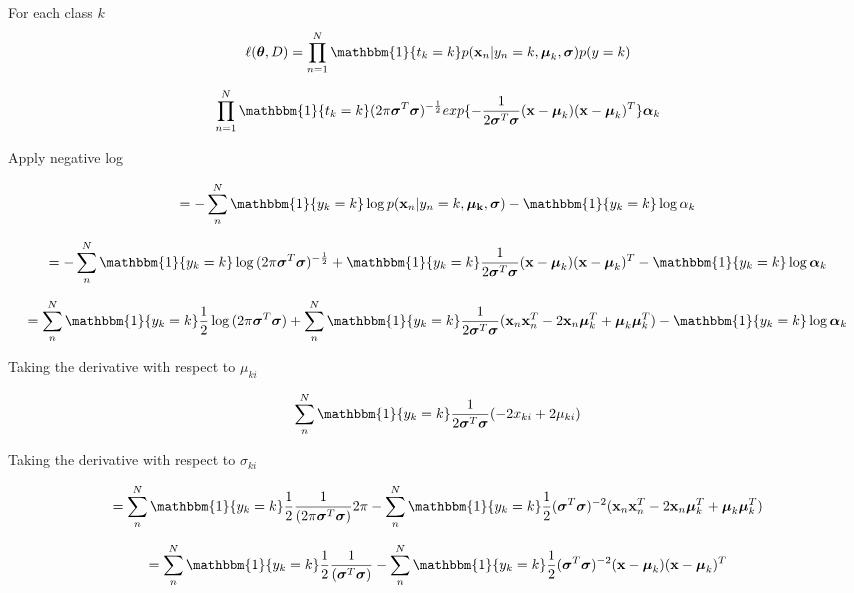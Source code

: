 \documentclass[12pt,letterpaper]{article} %
\newcommand{\bs}[1]{\bm{\mathrm{#1}}} %
\newcommand{\switch}[0]{\mathbbm{1}\{y_k=k\}}
\begin{document}
For each class $k$
\begin{equation*}
\ell(\bs{\theta},D) = \prod^N_{n=1}\mathbbm{1}\{t_k=k\}p(\bs{x}_n|y_n=k,\bs{\mu}_k,\bs{\sigma})p(y=k)
\end{equation*}


\begin{equation*}
\prod^N_{n=1}\mathbbm{1}\{t_k=k\}(2\pi\bs{\sigma}^T\bs{\sigma})^{-\frac{1}{2}}exp\{-\frac{1}{2\bs{\sigma}^T\bs{\sigma}}(\bs{x}-\bs{\mu}_k)(\bs{x}-\bs{\mu}_k)^T\}\bs{\alpha}_k
\end{equation*}

Apply negative log

\begin{equation*}
= -\sum^N_n\switch\log{p(\bs{x}_n|y_n=k,\bs{\mu_k},\bs{\sigma})}-\switch\log{\alpha_k}
\end{equation*}

\begin{equation*}
 = -\sum^N_n\switch\log{(2\pi\bs{\sigma}^T\bs{\sigma})^{-\frac{1}{2}}} + \switch\frac{1}{2\bs{\sigma}^T\bs{\sigma}}(\bs{x}-\bs{\mu}_k)(\bs{x}-\bs{\mu}_k)^T-\switch\log{\bs{\alpha}_k}
\end{equation*}

\begin{equation*}
 =\sum^N_n\switch\frac{1}{2}\log{(2\pi\bs{\sigma}^T\bs{\sigma})}+ \sum^N_n\switch\frac{1}{2\bs{\sigma}^T\bs{\sigma}}(\bs{x}_n\bs{x}^T_n-2\bs{x}_n\bs{\mu}_k^T+\bs{\mu}_k\bs{\mu}_k^T)-\switch\log{\bs{\alpha}_k}
\end{equation*}

Taking the derivative with respect to $\mu_{ki}$ 

\begin{equation*}
  \sum^N_n\switch\frac{1}{2\bs{\sigma}^T\bs{\sigma}}(-2x_{ki}+2\mu_{ki})
\end{equation*}

Taking the derivative with respect to $\sigma_{ki}$ 

\begin{equation*}
=\sum^N_n\switch\frac{1}{2}\frac{1}{(2\pi\bs{\sigma}^T\bs{\sigma})}2\pi - \sum^N_n\switch\frac{1}{2}(\bs{\sigma}^T\bs{\sigma})^{-2}(\bs{x}_n\bs{x}^T_n-2\bs{x}_n\bs{\mu}_k^T+\bs{\mu}_k\bs{\mu}_k^T)
 \end{equation*}

\begin{equation*}
=\sum^N_n\switch\frac{1}{2}\frac{1}{(\bs{\sigma}^T\bs{\sigma})} - \sum^N_n\switch\frac{1}{2}(\bs{\sigma}^T\bs{\sigma})^{-2}(\bs{x}-\bs{\mu}_k)(\bs{x}-\bs{\mu}_k)^T
 \end{equation*}
 
\end{document}
